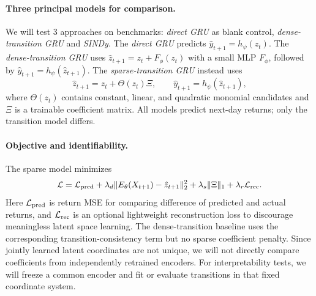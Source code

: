 \documentclass{article}
\begin{document}
\paragraph{Three principal models for comparison.}
We will test 3 approaches on benchmarks: \emph{direct GRU} as blank control, \emph{dense-transition GRU} and \emph{SINDy}. The \emph{direct GRU} predicts $\hat y_{t+1}=h_\psi(z_t)$. The \emph{dense-transition GRU} uses
$\hat z_{t+1}=z_t+F_\phi(z_t)$ with a small MLP $F_\phi$, followed by $\hat y_{t+1}=h_\psi(\hat z_{t+1})$. The \emph{sparse-transition GRU} instead uses
\begin{equation}
\hat z_{t+1}=z_t+\Theta(z_t)\Xi,\qquad
\hat y_{t+1}=h_\psi(\hat z_{t+1}),
\end{equation}
where $\Theta(z_t)$ contains constant, linear, and quadratic monomial candidates and $\Xi$ is a trainable coefficient matrix. All models predict next-day returns; only the transition model differs.

\paragraph{Objective and identifiability.}
The sparse model minimizes
\begin{equation}
\mathcal L=\mathcal L_{\rm pred}
+\lambda_d\|E_\theta(X_{t+1})-\hat z_{t+1}\|_2^2
+\lambda_s\|\Xi\|_1
+\lambda_r\mathcal L_{\rm rec}.
\end{equation}
Here $\mathcal L_{\rm pred}$ is return MSE for comparing difference of predicted and actual returns, and $\mathcal L_{\rm rec}$ is an optional lightweight reconstruction loss to discourage meaningless latent space learning. The dense-transition baseline uses the corresponding transition-consistency term but no sparse coefficient penalty. Since jointly learned latent coordinates are not unique, we will not directly compare coefficients from independently retrained encoders. For interpretability tests, we will freeze a common encoder and fit or evaluate transitions in that fixed coordinate system.
\end{document}

